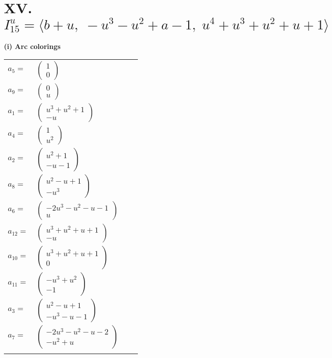 \documentclass[1p]{elsarticle_modified}
\theoremstyle{definition}
\begin{document}
\centering \section*{XV. $I^u_{15}= \langle b+u,\;- u^3- u^2+a-1,\;u^4+u^3+u^2+u+1 \rangle$}
\flushleft \textbf{(i) Arc colorings}\\
\begin{tabular}{m{7pt} m{180pt} m{7pt} m{180pt} }
\flushright $a_{5}=$&$\begin{pmatrix}1\\0\end{pmatrix}$ \\
\flushright $a_{9}=$&$\begin{pmatrix}0\\u\end{pmatrix}$ \\
\flushright $a_{1}=$&$\begin{pmatrix}u^3+u^2+1\\- u\end{pmatrix}$ \\
\flushright $a_{4}=$&$\begin{pmatrix}1\\u^2\end{pmatrix}$ \\
\flushright $a_{2}=$&$\begin{pmatrix}u^2+1\\- u-1\end{pmatrix}$ \\
\flushright $a_{8}=$&$\begin{pmatrix}u^2- u+1\\- u^3\end{pmatrix}$ \\
\flushright $a_{6}=$&$\begin{pmatrix}-2 u^3- u^2- u-1\\u\end{pmatrix}$ \\
\flushright $a_{12}=$&$\begin{pmatrix}u^3+u^2+u+1\\- u\end{pmatrix}$ \\
\flushright $a_{10}=$&$\begin{pmatrix}u^3+u^2+u+1\\0\end{pmatrix}$ \\
\flushright $a_{11}=$&$\begin{pmatrix}- u^3+u^2\\-1\end{pmatrix}$ \\
\flushright $a_{3}=$&$\begin{pmatrix}u^2- u+1\\- u^3- u-1\end{pmatrix}$ \\
\flushright $a_{7}=$&$\begin{pmatrix}-2 u^3- u^2- u-2\\- u^2+u\end{pmatrix}$\\&\end{tabular}
\end{document}
